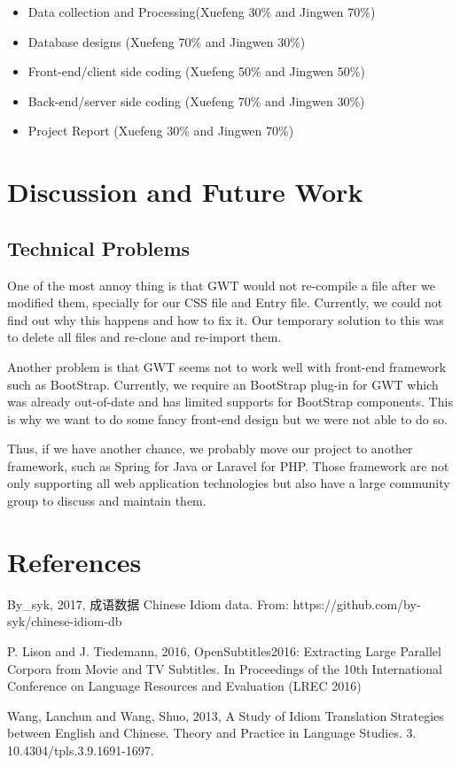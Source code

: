 \documentclass[11pt]{article} %
\begin{document}
\begin{itemize}
  \item Data collection and Processing(Xuefeng 30\% and Jingwen 70\%)
    \item Database designs (Xuefeng 70\% and Jingwen 30\%)
    \item Front-end/client side coding (Xuefeng 50\% and Jingwen 50\%)
    \item Back-end/server side coding (Xuefeng 70\% and Jingwen 30\%)
    \item Project Report (Xuefeng 30\% and Jingwen 70\%)
\end{itemize}

\section{Discussion and Future Work}
\subsection{Technical Problems}
\indent One of the most annoy thing is that GWT would not re-compile a file after we modified them, specially for our CSS file and Entry file. Currently, we could not find out why this happens and how to fix it. Our temporary solution to this was to delete all files and re-clone and re-import them.

Another problem is that GWT seems not to work well with front-end framework such as BootStrap. Currently, we require an BootStrap plug-in for GWT which was already out-of-date and has limited supports for BootStrap components. This is why we want to do some fancy front-end design but we were not able to do so.

Thus, if we have another chance, we probably move our project to another framework, such as Spring for Java or Laravel for PHP. Those framework are not only supporting all web application technologies but also have a large community group to discuss and maintain them.



\section{References}

By\_syk, 2017, 成语数据 Chinese Idiom data. From: https://github.com/by-syk/chinese-idiom-db

P. Lison and J. Tiedemann, 2016, OpenSubtitles2016: Extracting Large Parallel Corpora from Movie and TV Subtitles. In Proceedings of the 10th International Conference on Language Resources and Evaluation (LREC 2016)

Wang, Lanchun and Wang, Shuo,  2013, A Study of Idiom Translation Strategies between English and Chinese. Theory and Practice in Language Studies. 3. 10.4304/tpls.3.9.1691-1697. 
\end{document}
